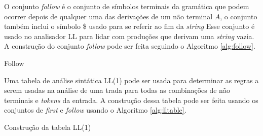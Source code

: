 O conjunto \textit{follow} é o conjunto de símbolos terminais da gramática que podem ocorrer depois de qualquer uma das derivações de um não terminal $A$, o conjunto também inclui o símbolo \$ usado para se referir ao fim da \textit{string} Esse conjunto é usado no analisador LL para lidar com produções que derivam uma \textit{string} vazia. A construção do conjunto \textit{follow} pode ser feita seguindo o Algoritmo \ref{alg:follow}.

\begin{algorithm}[htp]
    \caption{Follow}\label{alg:follow}
\end{algorithm}
{}

Uma tabela de análise sintática LL(1) pode ser usada para determinar as regras a serem usadas na análise de uma trada para todas as combinações de não terminais e \textit{tokens} da entrada. A construção dessa tabela pode ser feita usando os conjuntos de \textit{first} e \textit{follow} usando o Algoritmo \ref{alg:lltable}.

\begin{algorithm}[htp]
    \caption { Construção da tabela LL(1)}\label{alg:lltable}
    
\end{algorithm}
{}

